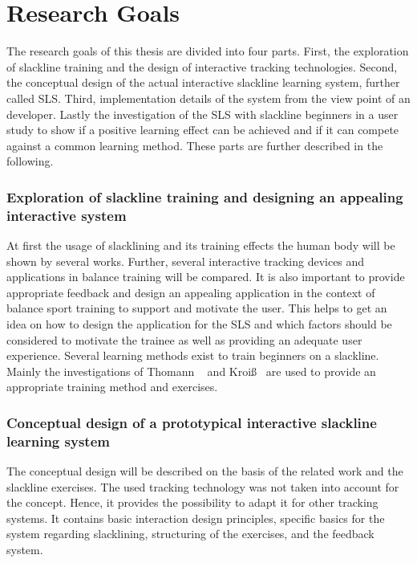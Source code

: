 \section{Research Goals}\label{1_2_researchGoals}
The research goals of this thesis are divided into four parts. 
First, the exploration of slackline training and the design of interactive tracking technologies.
Second, the conceptual design of the actual interactive slackline learning system, further called SLS.
Third, implementation details of the system from the view point of an developer.
Lastly the investigation of the SLS with slackline beginners in a user study to show if a positive learning effect can be achieved and if it can compete against a common learning method.
These parts are further described in the following.

\subsubsection{Exploration of slackline training and designing an appealing interactive system}
At first the usage of slacklining and its training effects the human body will be shown by several works.
Further, several interactive tracking devices and applications in balance training will be compared.
It is also important to provide appropriate feedback and design an appealing application in the context of balance sport training to support and motivate the user.
This helps to get an idea on how to design the application for the SLS and which factors should be considered to motivate the trainee as well as providing an adequate user experience.
Several learning methods exist to train beginners on a slackline.
Mainly the investigations of Thomann ~\cite{Thomann2013-aa} and Kroiß~\cite{Kroiss2007-ab} are used to provide an appropriate training method and exercises. 

\subsubsection{Conceptual design of a prototypical interactive slackline learning system}
The conceptual design will be described on the basis of the related work and the slackline exercises.
The used tracking technology was not taken into account for the concept.
Hence, it provides the possibility to adapt it for other tracking systems.
It contains basic interaction design principles, specific basics for the system regarding slacklining, structuring of the exercises, and the feedback system.

